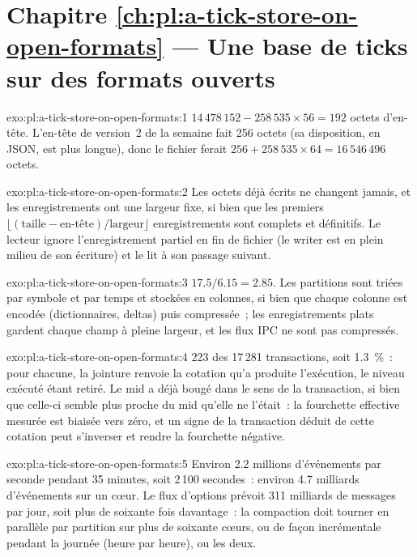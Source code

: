 \section*{Chapitre \ref{ch:pl:a-tick-store-on-open-formats} --- Une base de ticks sur des formats ouverts}

\begin{solution}{exo:pl:a-tick-store-on-open-formats:1}
$14\,478\,152 - 258\,535 \times 56 = 192$ octets d'en-tête. L'en-tête de version~2 de la semaine fait 256 octets (sa disposition, en JSON,
est plus longue), donc le fichier ferait $256 + 258\,535 \times 64 = 16\,546\,496$ octets.
\end{solution}

\begin{solution}{exo:pl:a-tick-store-on-open-formats:2}
Les octets déjà écrits ne changent jamais, et les enregistrements ont une largeur fixe, si bien que les premiers
$\lfloor (\text{taille} - \text{en-tête}) / \text{largeur} \rfloor$ enregistrements sont complets et définitifs. Le lecteur ignore l'enregistrement partiel
en fin de fichier (le writer est en plein milieu de son écriture) et le lit à son passage suivant.
\end{solution}

\begin{solution}{exo:pl:a-tick-store-on-open-formats:3}
$17.5 / 6.15 = 2.85$. Les partitions sont triées par symbole et par temps et stockées en colonnes, si bien que chaque colonne est encodée (dictionnaires,
deltas) puis compressée~; les enregistrements plats gardent chaque champ à pleine largeur, et les flux IPC ne sont pas compressés.
\end{solution}

\begin{solution}{exo:pl:a-tick-store-on-open-formats:4}
223 des 17\,281 transactions, soit 1.3~\%~: pour chacune, la jointure renvoie la cotation qu'a produite l'exécution, le niveau exécuté étant retiré.
Le mid a déjà bougé dans le sens de la transaction, si bien que celle-ci semble plus proche du mid qu'elle ne l'était~: la fourchette effective
mesurée est biaisée vers zéro, et un signe de la transaction déduit de cette cotation peut s'inverser et rendre la fourchette négative.
\end{solution}

\begin{solution}{exo:pl:a-tick-store-on-open-formats:5}
Environ 2.2 millions d'événements par seconde pendant 35 minutes, soit 2\,100 secondes~: environ 4.7 milliards d'événements sur un cœur. Le flux
d'options prévoit 311 milliards de messages par jour, soit plus de soixante fois davantage~: la compaction doit tourner en parallèle par partition sur
plus de soixante cœurs, ou de façon incrémentale pendant la journée (heure par heure), ou les deux.
\end{solution}

